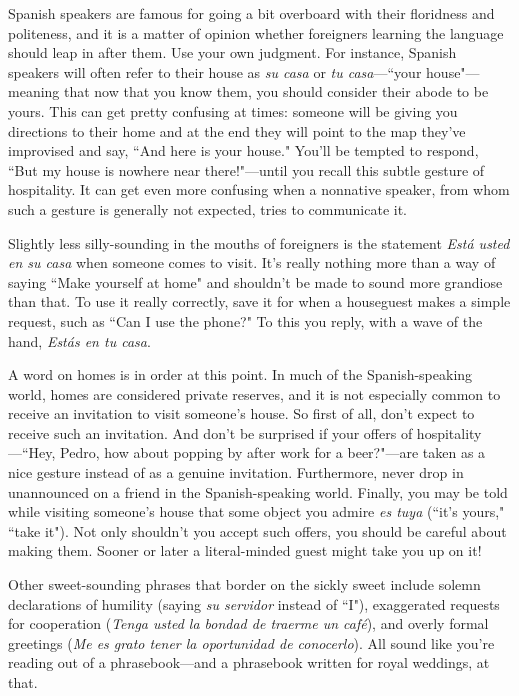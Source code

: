 Spanish speakers are famous for going a bit overboard with
their floridness and politeness, and it is a matter of opinion whether
foreigners learning the language should leap in after them. Use your
own judgment. For instance, Spanish speakers will often refer to their
house as \emph{su casa} or \emph{tu casa}---``your house"---meaning that now that
you know them, you should consider their abode to be yours. This can
get pretty confusing at times: someone will be giving you directions to
their home and at the end they will point to the map they've improvised and say, ``And here is your house." You'll be tempted to respond,
``But my house is nowhere near there!"---until you recall this subtle
gesture of hospitality. It can get even more confusing when a nonnative speaker, from whom such a gesture is generally not expected,
tries to communicate it.

Slightly less silly-sounding in the mouths of foreigners is the
statement \emph{Está usted en su casa} when someone comes to visit. It's really nothing more than a way of saying ``Make yourself at home" and
shouldn't be made to sound more grandiose than that. To use it really
correctly, save it for when a houseguest makes a simple request, such
as ``Can I use the phone?" To this you reply, with a wave of the hand,
\emph{Estás en tu casa}.

A word on homes is in order at this point. In much of the
Spanish-speaking world, homes are considered private reserves, and it
is not especially common to receive an invitation to visit someone's
house. So first of all, don't expect to receive such an invitation. And
don't be surprised if your offers of hospitality---``Hey, Pedro, how about
popping by after work for a beer?"---are taken as a nice gesture instead
of as a genuine invitation. Furthermore, never drop in unannounced on
a friend in the Spanish-speaking world. Finally, you may be told while
visiting someone's house that some object you admire \emph{es tuya} (``it's
yours," ``take it"). Not only shouldn't you accept such offers, you
should be careful about making them. Sooner or later a literal-minded
guest might take you up on it!

Other sweet-sounding phrases that border on the sickly sweet
include solemn declarations of humility (saying \emph{su servidor} instead of
``I"), exaggerated requests for cooperation (\emph{Tenga usted la bondad de
traerme un café}), and overly formal greetings (\emph{Me es grato tener la
oportunidad de conocerlo}). All sound like you're reading out of a
phrasebook---and a phrasebook written for royal weddings, at that.

